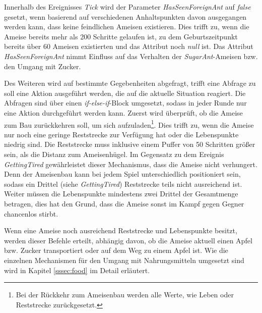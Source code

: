 Innerhalb des Ereignisses \textit{Tick} wird der Parameter \textit{HasSeenForeignAnt} auf \textit{false} gesetzt, wenn basierend auf verschiedenen Anhaltspunkten davon ausgegangen werden kann, dass keine feindlichen Ameisen existieren. Dies trifft zu, wenn die Ameise bereits mehr als 200 Schritte gelaufen ist, zu dem Geburtszeitpunkt bereits über 60 Ameisen existierten und das Attribut noch \textit{null} ist. Das Attribut \textit{HasSeenForeignAnt} nimmt Einfluss auf das Verhalten der \textit{SugarAnt}-Ameisen bzw. den Umgang mit Zucker.

Des Weiteren wird auf bestimmte Gegebenheiten abgefragt, trifft eine Abfrage zu soll eine Aktion ausgeführt werden, die auf die aktuelle Situation reagiert. Die Abfragen sind über einen \textit{if-else-if}-Block umgesetzt, sodass in jeder Runde nur eine Aktion durchgeführt werden kann. Zuerst wird überprüft, ob die Ameise zum Bau zurückkehren soll, um sich aufzuladen\footnote{Bei der Rückkehr zum Ameisenbau werden alle Werte, wie Leben oder Reststrecke zurückgesetzt.}. Dies trifft zu, wenn die Ameise nur noch eine geringe Reststrecke zur Verfügung hat oder die Lebenspunkte niedrig sind. Die Reststrecke muss inklusive einem Puffer von 50 Schritten größer sein, als die Distanz zum Ameisenhügel. Im Gegensatz zu dem Ereignis \textit{GettingTired} gewährleistet dieser Mechanismus, dass die Ameise nicht verhungert. Denn der Ameisenbau kann bei jedem Spiel unterschiedlich positioniert sein, sodass ein Drittel (siehe \textit{GettingTired}) Reststrecke teils nicht ausreichend ist. Weiter müssen die Lebenspunkte mindestens zwei Drittel der Gesamtmenge betragen, dies hat den Grund, dass die Ameise sonst im Kampf gegen Gegner chancenlos stirbt.

Wenn eine Ameise noch ausreichend Reststrecke und Lebenspunkte besitzt, werden dieser Befehle erteilt, abhängig davon, ob die Ameise aktuell einen Apfel bzw. Zucker transportiert oder auf dem Weg zu einem Apfel ist. Wie die einzelnen Mechanismen für den Umgang mit Nahrungsmitteln umgesetzt sind wird in Kapitel \ref{sssec:food} im Detail erläutert.

